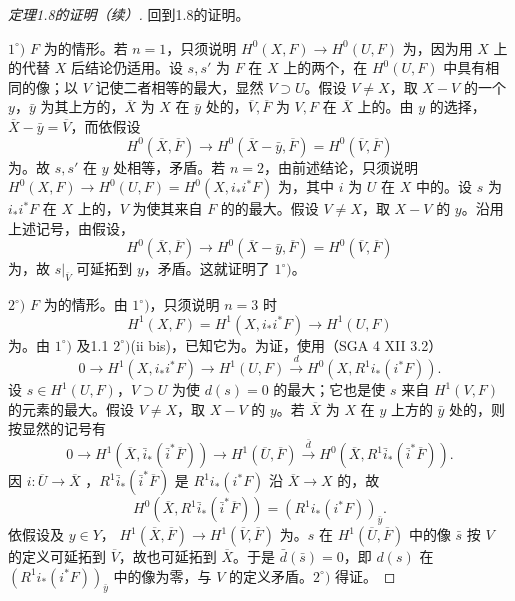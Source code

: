 \begin{proof}[定理1.8的证明（续）]
回到1.8的证明。

$1^\circ)$ $F$ 为的情形。若 $n=1$，只须说明 $H^0(X,F)\to H^0(U,F)$ 为，因为用 $X$ 上的代替 $X$ 后结论仍适用。设 $s,s'$ 为 $F$ 在 $X$ 上的两个，在 $H^0(U,F)$ 中具有相同的像；以 $V$ 记使二者相等的最大，显然 $V\supset U$。假设 $V\ne X$，取 $X-V$ 的一个 $y$，$\bar y$ 为其上方的，$\overline X$ 为 $X$ 在 $\bar y$ 处的，$\overline V,\overline F$ 为 $V,F$ 在 $\overline X$ 上的。由 $y$ 的选择，$\overline X-\bar y=\overline V$，而依假设
\[H^0(\overline X,\overline F)\longrightarrow H^0(\overline X-\bar y,\overline F)=H^0(\overline V,\overline F)\]
为。故 $s,s'$ 在 $y$ 处相等，矛盾。若 $n=2$，由前述结论，只须说明 $H^0(X,F)\to H^0(U,F)=H^0(X,i_*i^*F)$ 为，其中 $i$ 为 $U$ 在 $X$ 中的。设 $s$ 为 $i_*i^*F$ 在 $X$ 上的，$V$ 为使其来自 $F$ 的的最大。假设 $V\ne X$，取 $X-V$ 的 $y$。沿用上述记号，由假设，
\[H^0(\overline X,\overline F)\longrightarrow H^0(\overline X-\bar y,\overline F)=H^0(\overline V,\overline F)\]
为，故 $s|_{\overline V}$ 可延拓到 $y$，矛盾。这就证明了 $1^\circ)$。

$2^\circ)$ $F$ 为的情形。由 $1^\circ)$，只须说明 $n=3$ 时
\[H^1(X,F)=H^1(X,i_*i^*F)\longrightarrow H^1(U,F)\]
为。由 $1^\circ)$ 及1.1 $2^\circ)$(ii bis)，已知它为。为证，使用（SGA 4 XII 3.2）
\[0\longrightarrow H^1(X,i_*i^*F)\longrightarrow H^1(U,F)\xrightarrow{d}H^0(X,R^1i_*(i^*F)).\]
设 $s\in H^1(U,F)$，$V\supset U$ 为使 $d(s)=0$ 的最大；它也是使 $s$ 来自 $H^1(V,F)$ 的元素的最大。假设 $V\ne X$，取 $X-V$ 的 $y$。若 $\overline X$ 为 $X$ 在 $y$ 上方的 $\bar y$ 处的，则按显然的记号有
\[0\longrightarrow H^1(\overline X,\bar i_*(\bar i^*\overline F))\longrightarrow H^1(\overline U,\overline F)\xrightarrow{\bar d}H^0(\overline X,R^1\bar i_*(\bar i^*\overline F)).\]
因 $i:\overline U\to\overline X$ ，$R^1\bar i_*(\bar i^*\overline F)$ 是 $R^1i_*(i^*F)$ 沿 $\overline X\to X$ 的，故
\[H^0(\overline X,R^1\bar i_*(\bar i^*\overline F))=(R^1i_*(i^*F))_{\bar y}.\]
依假设及 $y\in Y$， $H^1(\overline X,\overline F)\to H^1(\overline V,\overline F)$ 为。$s$ 在 $H^1(\overline U,\overline F)$ 中的像 $\bar s$ 按 $V$ 的定义可延拓到 $\overline V$，故也可延拓到 $\overline X$。于是 $\bar d(\bar s)=0$，即 $d(s)$ 在 $(R^1i_*(i^*F))_{\bar y}$ 中的像为零，与 $V$ 的定义矛盾。$2^\circ)$ 得证。


\end{proof}

